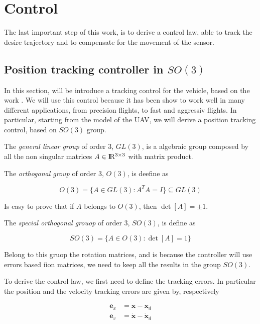 \chapter{Control}
\label{control}

The last important step of this work, is to derive a control law, able to track the desire trajectory and to compensate for the movement of the sensor.

\section{Position tracking controller in \texorpdfstring{$SO(3)$}{TEXT}}

In this section, will be introduce a tracking control for the vehicle, based on the work \cite{LeeController}. We will use this control because it has been show to work well in many different applications, from precision flights, to fast and aggressiv flights. In particular, starting from the model of the UAV, we will derive a position tracking control, based on $SO(3)$ group.

\noindent The \textit{general linear group} of order $3$, $GL(3)$, is a algebraic group composed by all the non singular matrices $A \in \rm I\!R^{3\times 3}$ with matrix product.

\noindent The \textit{orthogonal group} of order $3$, $O(3)$, is deefine as

\begin{equation*}
	O(3) = \{A \in GL(3) : A^TA=I \} \subseteq GL(3)
\end{equation*}

\noindent Is easy to prove that if $A$ belongs to $O(3)$, then $\det[A]=\pm 1$.

\noindent The \textit{special orthogonal grouop} of order $3$, $SO(3)$, is define as

\begin{equation*}
	SO(3) = \{A \in O(3) : \det[A] = 1\} 
\end{equation*}

\noindent Belong to this gruop the rotation matrices, and is because the controller will use errors based iìon matrices, we need to keep all the results in the group $SO(3)$.

\noindent To derive the control law, we first need to define the tracking errors. In particular the position and the velocity tracking errors are given by, respectively

\begin{align}
	\mathbf{e}_x &= \mathbf{x} - \mathbf{x}_d \\ 
	\mathbf{e}_v &= \dot{\mathbf{x}} - \dot{\mathbf{x}}_d
\end{align}

